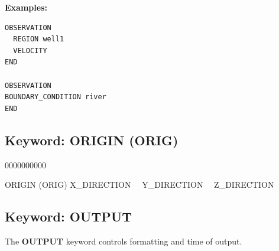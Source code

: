 \documentclass[12pt]{article}
\begin{document}
\begin{mdframed}

{\noindent\bf Examples:}
\begin{verbatim}
OBSERVATION
  REGION well1
  VELOCITY
END

OBSERVATION
BOUNDARY_CONDITION river
END
\end{verbatim}
\end{mdframed}

\hyperlink{target_key}{\return}


\newpage
\protect\hypertarget{target_orig}{}

\subsection{Keyword: ORIGIN (ORIG)}
\begin{deflist}{0000000000}
\item[ORIGIN (ORIG)] X\_DIRECTION \ \ Y\_DIRECTION \ \ Z\_DIRECTION
\end{deflist}

\hyperlink{target_key}{\return}



\newpage
\protect\hypertarget{target_output}{}

\subsection{Keyword: OUTPUT}

 The {\bf OUTPUT} keyword controls formatting and time of output.

\end{document}
